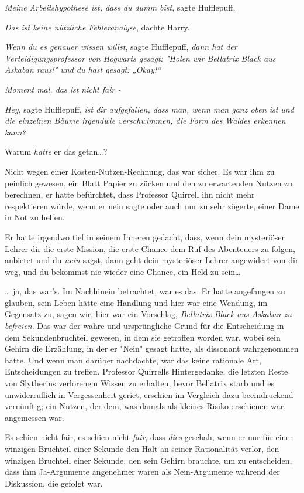 {\emph{Meine Arbeitshypothese ist, dass du dumm bist}, sagte Hufflepuff.

\emph{Das ist keine nützliche Fehleranalyse}, dachte Harry.

\emph{Wenn du es genauer wissen willst}, sagte Hufflepuff, \emph{dann hat der Verteidigungsprofessor von Hogwarts gesagt: "Holen wir Bellatrix Black aus Askaban raus!" und du hast gesagt: „Okay!“}

\emph{Moment mal, das ist nicht fair -}

\emph{Hey}, sagte Hufflepuff, \emph{ist dir aufgefallen, dass man, wenn man ganz oben ist und die einzelnen Bäume irgendwie verschwimmen, die Form des Waldes erkennen kann?}

Warum \emph{hatte} er das getan…?

Nicht wegen einer Kosten-Nutzen-Rechnung, das war sicher. Es war ihm zu peinlich gewesen, ein Blatt Papier zu zücken und den zu erwartenden Nutzen zu berechnen, er hatte befürchtet, dass Professor Quirrell ihn nicht mehr respektieren würde, wenn er nein sagte oder auch nur zu sehr zögerte, einer Dame in Not zu helfen.

Er hatte irgendwo tief in seinem Inneren gedacht, dass, wenn dein mysteriöser Lehrer dir die erste Mission, die erste Chance dem Ruf des Abenteuers zu folgen, anbietet und du \emph{nein} sagst, dann geht dein mysteriöser Lehrer angewidert von dir weg, und du bekommst nie wieder eine Chance, ein Held zu sein…

… ja, das war's. Im Nachhinein betrachtet, war es das. Er hatte angefangen zu glauben, sein Leben hätte eine Handlung und hier war eine Wendung, im Gegensatz zu, sagen wir, hier war ein Vorschlag, \emph{Bellatrix Black aus Askaban zu befreien}. Das war der wahre und ursprüngliche Grund für die Entscheidung in dem Sekundenbruchteil gewesen, in dem sie getroffen worden war, wobei sein Gehirn die Erzählung, in der er "Nein" gesagt hatte, als dissonant wahrgenommen hatte. Und wenn man darüber nachdachte, war das keine rationale Art, Entscheidungen zu treffen. Professor Quirrells Hintergedanke, die letzten Reste von Slytherins verlorenem Wissen zu erhalten, bevor Bellatrix starb und es unwiderruflich in Vergessenheit geriet, erschien im Vergleich dazu beeindruckend vernünftig; ein Nutzen, der dem, was damals als kleines Risiko erschienen war, angemessen war.

Es schien nicht fair, es schien nicht \emph{fair}, dass \emph{dies} geschah, wenn er nur für einen winzigen Bruchteil einer Sekunde den Halt an seiner Rationalität verlor, den winzigen Bruchteil einer Sekunde, den sein Gehirn brauchte, um zu entscheiden, dass ihm Ja-Argumente angenehmer waren als Nein-Argumente während der Diskussion, die gefolgt war.

}
